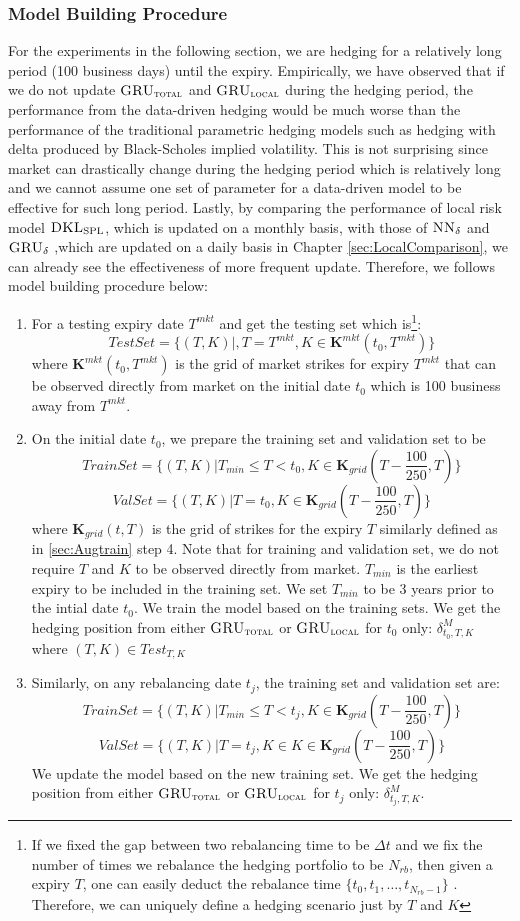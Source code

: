 \documentclass[letterpaper,12pt,titlepage,oneside,final]{book}
\numberwithin{equation}{section}
\theoremstyle{definition}
\newcommand{\model}{\textsc{GRU}_\delta}
\newcommand{\modelT}{\textsc{GRU}_{\textsc{total}}}
\newcommand{\modelL}{\textsc{GRU}_{\textsc{local}}}
\newcommand{\modelN}{\textsc{NN}_\delta}
\newcommand{\DT}{\Delta t}
\newcommand{\DKLs}{\bf\textsc{DKL}_{\text{SPL}}}
\begin{document}
\subsubsection{Model Building Procedure}
For the experiments in the following section, we are hedging for a relatively long period (100 business days) until the expiry.  Empirically, we have observed that if we do not update $\modelT$ and $\modelL$ during the hedging period, the performance from the data-driven hedging would be much worse than the performance of the traditional parametric hedging models such as hedging with delta produced by Black-Scholes implied volatility. This is not surprising since market can drastically change during the hedging period which is relatively long and we cannot assume one set of parameter for a data-driven model to be effective for such long period. Lastly, by comparing the performance of local risk model  $\DKLs$, which is updated on a monthly basis,  with those of $\modelN$ and $\model$ ,which are updated on a daily basis in Chapter \ref{sec:LocalComparison}, we can already see the effectiveness of more frequent update. Therefore, we  follows model building procedure below:
\begin{enumerate}
	\item For a  testing expiry date $T^{mkt}$ and get the testing set  which is\footnote{ If we fixed the gap between two rebalancing time to be $\DT$ and we fix the number of times we rebalance the hedging portfolio to be $N_{rb}$, then given a expiry $T$, one can easily deduct the rebalance time $\{t_0,t_1, \dots, t_{N_{rb}-1}\}$ . Therefore, we can uniquely define a hedging scenario just by $T$ and $K$}:
	\[
	TestSet=\{(T,K)|,T=T^{mkt},K \in \mathbf{K}^{mkt}(t_0,T^{mkt})\}
	\] where $\mathbf{K}^{mkt}(t_0,T^{mkt})$ is the grid of market strikes for expiry $T^{mkt}$ that can be observed directly from market on the initial date $t_0$ which is 100 business away from $T^{mkt}$.
	\item On the initial date $t_0$, we prepare the training set  and validation set to be 
		\[TrainSet=\{(T,K)|T_{min} \leq T<t_0, K \in \mathbf{K}_{grid}(T-\frac{100}{250},T)\}\]
			\[ValSet=\{(T,K)|T=t_0,  K \in \mathbf{K}_{grid}(T-\frac{100}{250},T)\}\]
		where $ \mathbf{K}_{grid}(t,T)$ is the  grid of strikes for the expiry $T$ similarly defined as in \ref{sec:Augtrain} step 4. Note that for training and validation set, we do not require $T$ and $K$ to be observed directly from market. $T_{min}$ is the earliest expiry to be included in the training set. We set $T_{min}$ to be 3 years prior to the intial date $t_0$. We train the model based on the training sets. We get the hedging position from either $\modelT$ or $\modelL$ for $t_0$ only: $\delta^{M}_{t_0,T,K}$ where $(T,K) \in Test_{T,K}$
		
	\item Similarly, on any rebalancing date $t_j$,  the training set  and validation set are: 
	\[TrainSet=\{(T,K)|T_{min} \leq T<t_j, K \in \mathbf{K}_{grid}(T-\frac{100}{250},T)\}\]
			\[ValSet=\{(T,K)|T=t_j, K \in K \in \mathbf{K}_{grid}(T-\frac{100}{250},T)\}\]
  We update the model based on the new training set. We get the hedging position from either $\modelT$ or $\modelL$ for $t_j$ only: $\delta^{M}_{t_j,T,K}$.
\end{enumerate}
\end{document}
